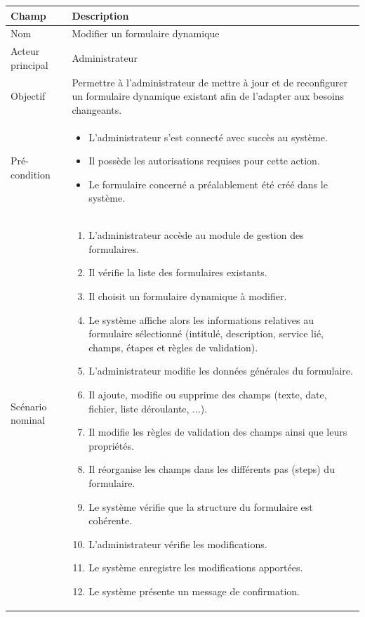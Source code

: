 \begin{longtable}{|p{3cm}|p{13cm}|}
\hline

\rowcolor{gray!20}
\textbf{Champ} & \textbf{Description} \\ \hline
\endfirsthead

 

Nom & Modifier un formulaire dynamique \\ \hline

Acteur principal & Administrateur \\ \hline

Objectif & Permettre à l’administrateur de mettre à jour et de reconfigurer un formulaire dynamique existant afin de l’adapter aux besoins changeants. \\ \hline

Pré-condition &
\begin{itemize}
    \item L'administrateur s'est connecté avec succès au système.
    \item Il possède les autorisations requises pour cette action.
    \item Le formulaire concerné a préalablement été créé dans le système. 
\end{itemize}
\\ \hline

Scénario nominal &
\begin{enumerate}
    \item L'administrateur accède au module de gestion des formulaires.
    \item Il vérifie la liste des formulaires existants.
    \item Il choisit un formulaire dynamique à modifier.
    \item Le système affiche alors les informations relatives au formulaire sélectionné (intitulé, description, service lié, champs, étapes et règles de validation).
    \item L'administrateur modifie les données générales du formulaire.
    \item Il ajoute, modifie ou supprime des champs (texte, date, fichier, liste déroulante, ...).
    \item Il modifie les règles de validation des champs ainsi que leurs propriétés.
    \item Il réorganise les champs dans les différents pas (steps) du formulaire.
    \item Le système vérifie que la structure du formulaire est cohérente.
    \item L'administrateur vérifie les modifications.
    \item Le système enregistre les modifications apportées.
    \item Le système présente un message de confirmation.
\end{enumerate}
\\ \hline


\end{longtable}
